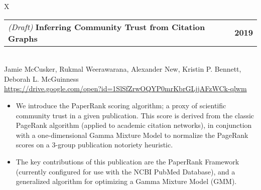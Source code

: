 \documentclass[10pt]{article}
\newcommand{\tabularxwidth}{\textwidth}
\begin{document}
        \begin{minipage}{\tabularxwidth}
        \begin{tabularx}{\tabularxwidth}{X}
            {
                \begin{tabularx}{\tabularxwidth}{@{}X r}
                        \textit{(Draft) }
                    \textbf{Inferring Community Trust from Citation Graphs} &
                    \textbf{
        2019} \\
                \end{tabularx}
            } \\
            Jamie McCusker, Rukmal Weerawarana, Alexander New, Kristin P. Bennett, Deborah L. McGuinness \\

            
            
                \url{https://drive.google.com/open?id=1SlSfZrwOQYP0mrKbrGLjjAFzWCk-qlwm} \\
            
            
        \end{tabularx}

        \begin{itemize}[noitemsep, topsep=3pt, parsep=0pt, partopsep=0pt]
            
                \item 
    We introduce the PaperRank scoring algorithm; a proxy of scientific community trust in a given publication. This score is derived from the classic PageRank algorithm (applied to academic citation networks), in conjunction with a one-dimensional Gamma Mixture Model to normalize the PageRank scores on a 3-group publication notoriety heuristic.
            
                \item 
    The key contributions of this publication are the PaperRank Framework (currently configured for use with the NCBI PubMed Database), and a generalized algorithm for optimizing a Gamma Mixture Model (GMM).
            

\end{itemize}
\end{minipage}
\end{document}
